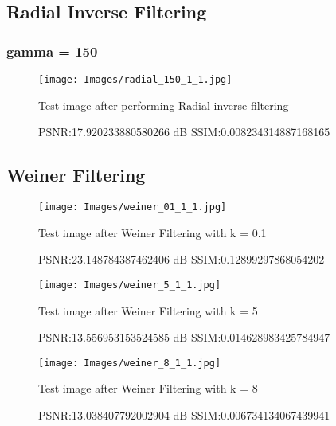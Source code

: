 \documentclass{article}
\begin{document}
\subsection{Radial Inverse Filtering}
\subsubsection{gamma = 150}
\begin{figure}[!htbp]

\begin{minipage}[!b]{1.0\linewidth}
  \centering
  \centerline{\texttt{[image: Images/radial\_150\_1\_1.jpg]}}
  \centerline{Test image after performing Radial inverse filtering}\medskip
  PSNR:17.920233880580266 dB
  SSIM:0.008234314887168165
\end{minipage}
%
\end{figure}

\subsection[!htbp]{Weiner Filtering}

\begin{figure}[!htbp]

\begin{minipage}[!b]{1.0\linewidth}
  \centering
  \centerline{\texttt{[image: Images/weiner\_01\_1\_1.jpg]}}
  \centerline{Test image after Weiner Filtering with k = 0.1}\medskip
   PSNR:23.148784387462406 dB
  SSIM:0.12899297868054202
\end{minipage}
%
\end{figure}

\begin{figure}[!htbp]

\begin{minipage}[!b]{1.0\linewidth}
  \centering
  \centerline{\texttt{[image: Images/weiner\_5\_1\_1.jpg]}}
  \centerline{Test image after Weiner Filtering with k = 5}\medskip
   PSNR:13.556953153524585 dB
  SSIM:0.014628983425784947
\end{minipage}
%
\end{figure}

\begin{figure}[!htbp]

\begin{minipage}[!b]{1.0\linewidth}
  \centering
  \centerline{\texttt{[image: Images/weiner\_8\_1\_1.jpg]}}
  \centerline{Test image after Weiner Filtering with k = 8}\medskip
   PSNR:13.038407792002904 dB
  SSIM:0.006734134067439941
\end{minipage}
%
\end{figure}
\end{document}
